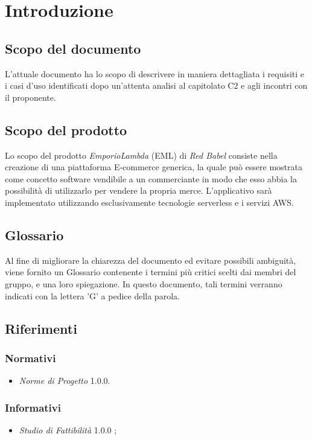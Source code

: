 \section{Introduzione}
\subsection{Scopo del documento}
L'attuale documento ha lo scopo di descrivere in maniera dettagliata i requisiti e i casi d'uso identificati dopo un'attenta analisi al capitolato C2 e agli incontri con il proponente.
\subsection{Scopo del prodotto}
Lo scopo del prodotto \textit{EmporioLambda} (EML) di \textit{Red Babel} consiste nella creazione di una piattaforma E-commerce generica, la quale può essere mostrata come concetto software vendibile a un commerciante in modo che esso abbia la possibilità di utilizzarlo per vendere la propria merce. L'applicativo sarà implementato utilizzando esclusivamente tecnologie serverless e i servizi AWS.
\subsection{Glossario}
Al fine di migliorare la chiarezza del documento ed evitare possibili ambiguità, viene fornito un Glossario contenente i termini più critici scelti dai membri del gruppo, e una loro spiegazione. In questo documento, tali termini verranno indicati con la lettera 'G' a pedice della parola.
\subsection{Riferimenti}
\subsubsection{Normativi}
\begin{itemize}
\item \textit{Norme di Progetto} 1.0.0.
\end{itemize}
\subsubsection{Informativi}
\begin{itemize}
\item \textit{Studio di Fattibilità} 1.0.0 ;

\end{itemize}